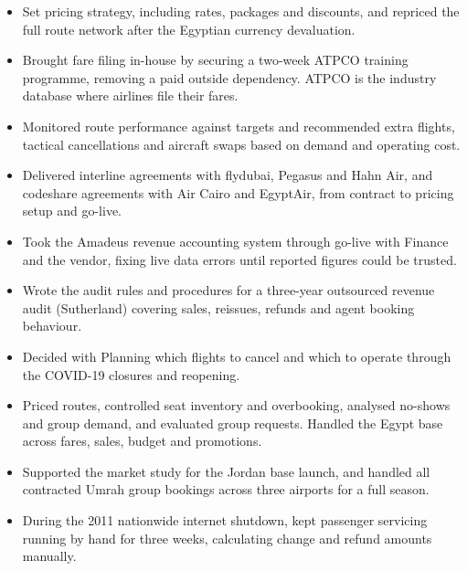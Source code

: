 \begin{itemize}
  \item Set pricing strategy, including rates, packages and discounts, and repriced the full route network after the Egyptian currency devaluation.
  \item Brought fare filing in-house by securing a two-week ATPCO training programme, removing a paid outside dependency. ATPCO is the industry database where airlines file their fares.
  \item Monitored route performance against targets and recommended extra flights, tactical cancellations and aircraft swaps based on demand and operating cost.
  \item Delivered interline agreements with flydubai, Pegasus and Hahn Air, and codeshare agreements with Air Cairo and EgyptAir, from contract to pricing setup and go-live.
  \item Took the Amadeus revenue accounting system through go-live with Finance and the vendor, fixing live data errors until reported figures could be trusted.
  \item Wrote the audit rules and procedures for a three-year outsourced revenue audit (Sutherland) covering sales, reissues, refunds and agent booking behaviour.
  \item Decided with Planning which flights to cancel and which to operate through the COVID-19 closures and reopening.
\end{itemize}

\begin{itemize}
  \item Priced routes, controlled seat inventory and overbooking, analysed no-shows and group demand, and evaluated group requests. Handled the Egypt base across fares, sales, budget and promotions.
  \item Supported the market study for the Jordan base launch, and handled all contracted Umrah group bookings across three airports for a full season.
  \item During the 2011 nationwide internet shutdown, kept passenger servicing running by hand for three weeks, calculating change and refund amounts manually.
\end{itemize}

